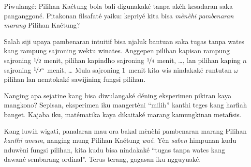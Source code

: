\documentclass[../../../include/open-logic-section]{subfiles}
\begin{document}
Piwulangé: Pilihan Kaétung bola-bali digunakaké tanpa akèh
kesadaran saka panganggoné. Pitakonan filsafaté yaiku: kepriyé kita
bisa \emph{mènèhi pambenaran marang} Pilihan Kaétung?

Salah siji upaya pambenaran intuitif bisa njaluk bantuan saka
tugas tanpa wates kang rampung sajroning wektu winates.
Anggepen pilihan kapisan rampung sajroning $\nicefrac{1}{2}$ menit,
pilihan kapindho sajroning $\nicefrac{1}{4}$ menit, \dots, lan
pilihan kaping $n$ sajroning $\nicefrac{1}{2^n}$ menit, \dots\@
Mula sajroning $1$~menit kita wis nindakaké runtutan $\omega$
pilihan lan nemtokaké sawijining fungsi pilihan.

Nanging apa sejatine kang bisa diwulangaké déning eksperimen pikiran
kaya mangkono? Sepisan, eksperimen iku mangertèni ``milih'' kanthi
teges kang harfiah banget. Kajaba iku, matématika kaya dikaitaké
marang kamungkinan metafisis.

Kang luwih wigati, panalaran mau ora bakal mènèhi pambenaran marang Pilihan
\emph{kanthi umum}, nanging mung Pilihan Kaétung \emph{waé}.
Yèn \emph{saben} himpunan kudu nduwèni fungsi pilihan, kita kudu bisa
nindakaké ``tugas tanpa wates kang dawané sembarang ordinal''.
Terus terang, gagasan iku ngguyuaké.
\end{document}
